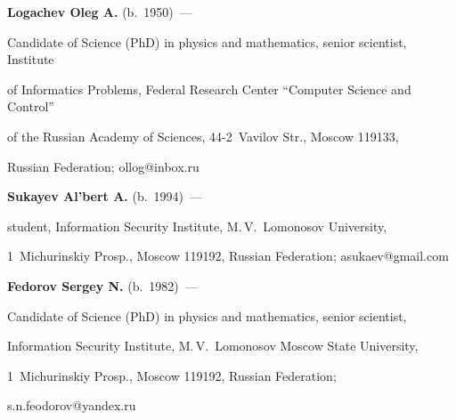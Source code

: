 







\Contr








\noindent


\textbf{Logachev Oleg A.} (b.\ 1950)~--- 


Candidate of Science (PhD) in physics and mathematics, senior scientist, Institute 


of Informatics Problems, Federal Research Center ``Computer Science and Control'' 


of the Russian Academy of Sciences, 44-2~Vavilov Str., Moscow 119133, 


Russian Federation; \mbox{ollog@inbox.ru}





\vspace*{3pt}








\noindent


\textbf{Sukayev Al'bert A.} (b.\ 1994)~--- 


student, Information Security Institute, M.\,V.~Lomonosov University, 


1~Michurinskiy Prosp., Moscow 119192, Russian Federation; \mbox{asukaev@gmail.com}





\vspace*{3pt}








\noindent


\textbf{Fedorov Sergey N.} (b.\ 1982)~--- 


Candidate of Science (PhD) in physics and mathematics, senior scientist, 


Information Security Institute, M.\,V.~Lomonosov Moscow State University, 


1~Michurinskiy Prosp., Moscow 119192, Russian Federation; 


\mbox{s.n.feodorov@yandex.ru}


\label{end\stat}





\renewcommand{\bibname}{\protect\rm Литература}


